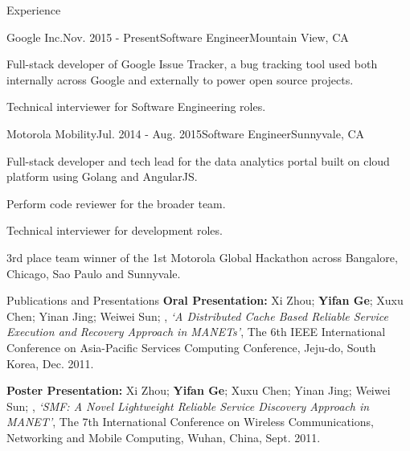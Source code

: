 \documentclass{resume} %
\begin{document}
\begin{rSection}{Experience}

\begin{rSubsection}{Google Inc.}{Nov. 2015 - Present}{Software Engineer}{Mountain View, CA}
\item Full-stack developer of Google Issue Tracker, a bug tracking tool used both internally across Google and externally to power open source projects.
\item Technical interviewer for Software Engineering roles.

\end{rSubsection}

\begin{rSubsection}{Motorola Mobility}{Jul. 2014 - Aug. 2015}{Software Engineer}{Sunnyvale, CA}
\item Full-stack developer and tech lead for the data analytics portal built on cloud platform using Golang and AngularJS.
\item Perform code reviewer for the broader team.
\item Technical interviewer for development roles.
\item 3rd place team winner of the 1st Motorola Global Hackathon across Bangalore, Chicago, Sao Paulo and Sunnyvale.
\end{rSubsection}



\end{rSection}


\begin{rSection}{Publications and Presentations}
{\bf Oral Presentation:} Xi Zhou; {\bf Yifan Ge}; Xuxu Chen; Yinan Jing; Weiwei Sun; , {\em `A Distributed Cache Based Reliable Service Execution and Recovery Approach in MANETs'}, The 6th IEEE International Conference on Asia-Pacific Services Computing Conference, Jeju-do, South Korea, Dec. 2011.

{\bf Poster Presentation:} Xi Zhou; {\bf Yifan Ge}; Xuxu Chen; Yinan Jing; Weiwei Sun; , {\em `SMF: A Novel Lightweight Reliable Service Discovery Approach in MANET'}, The 7th International Conference on Wireless Communications, Networking and Mobile Computing, Wuhan, China, Sept. 2011.
\end{rSection}
\end{document}
